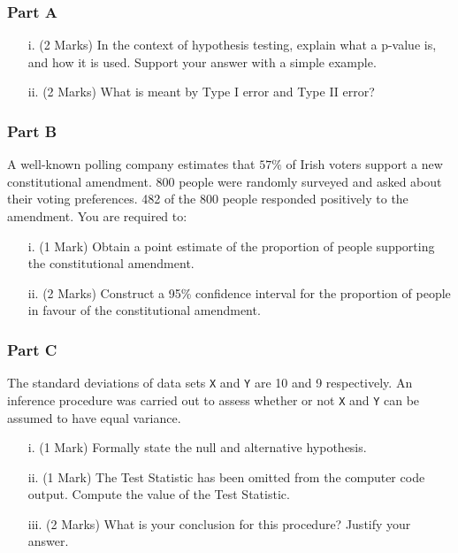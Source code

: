 \subsubsection*{Part A} %
\begin{itemize}
\item[i.](2 Marks) In the context of hypothesis testing, explain what a p-value is, and how it is used. Support your answer with a simple example.
\item[ii.](2 Marks) What is meant by Type I error and Type II error?
\end{itemize}
\subsubsection*{Part B} %
A well-known polling company estimates that $57\%$ of Irish voters support a new constitutional amendment. 800 people were randomly surveyed and asked about their voting preferences. 482 of the 800 people responded positively to the amendment. You are required to:

\begin{itemize}
\item [i.](1 Mark) Obtain a point estimate of the proportion of people supporting the constitutional amendment.
\item [ii.](2 Marks) Construct a 95\% confidence interval for the proportion of people in favour of the constitutional amendment.
\end{itemize}

\subsubsection*{Part C} %
The standard deviations of data sets \texttt{X} and \texttt{Y} are 10 and 9 respectively. An inference procedure was carried out to assess whether or not \texttt{X} and \texttt{Y} can be assumed to have equal variance.
\begin{itemize}
\item[i.](1 Mark) Formally state the null and alternative hypothesis.
\item[ii.](1 Mark) The Test Statistic has been omitted from the computer code output. Compute the value of the Test Statistic.
\item[iii.](2 Marks) What is your conclusion for this procedure? Justify your answer.
\end{itemize}

